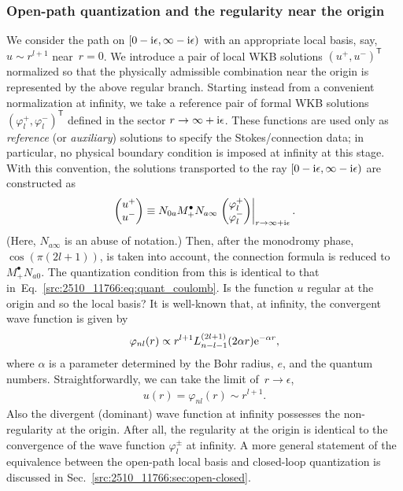 \subsubsection{Open-path quantization and the regularity near the origin}
We consider the path on $[0-\mathrm{i}\epsilon,\infty-\mathrm{i}\epsilon)$ with an appropriate local basis, say, $u\sim r^{l+1}$ near~$r=0$.
We introduce a pair of local WKB solutions $(u^{+},u^{-})^{\mathsf T}$ normalized so that the
physically admissible combination near the origin is represented by the above regular branch.
Starting instead from a convenient normalization at infinity, we take a reference pair of formal WKB solutions
$(\varphi_l^{+},\varphi_l^{-})^{\mathsf T}$ defined in the sector $r\to\infty+\mathrm{i}\epsilon$.
These functions are used only as \textit{reference} (or \textit{auxiliary}) solutions to specify the Stokes/connection
data; in particular, no physical boundary condition is imposed at infinity at this stage.
With this convention, the solutions transported to the ray $[0-\mathrm{i}\epsilon,\infty-\mathrm{i}\epsilon)$ are constructed as
\begin{align}
    \begin{pmatrix}
        u^{+} \\ u^{-}
    \end{pmatrix}
    \equiv
    N_{0a} M_{+}^\bullet N_{a\infty}
    \left.
    \begin{pmatrix}
        \varphi_l^{+} \\ \varphi_l^{-}
    \end{pmatrix}\right|_{r\to\infty+\mathrm{i} \epsilon} .
\end{align}
(Here, $N_{a\infty}$ is an abuse of notation.)
Then, after the monodromy phase, $\cos(\pi(2l+1))$, is taken into account, the connection formula is reduced to~$M_{+}^\bullet N_{a0}$. The quantization condition from this is identical to that in~Eq.~\eqref{src:2510_11766:eq:quant_coulomb}.
Is the function $u$ regular at the origin and so the local basis?
It is well-known that, at infinity, the convergent wave function is given by
\begin{align}
    \varphi_{nl}(r) \propto r^{l+1} L_{n-l-1}^{(2l+1)}(2\alpha r) \mathrm{e}^{-\alpha r} ,
\end{align}
where $\alpha$ is a parameter determined by the Bohr radius, $e$, and the quantum numbers.
Straightforwardly, we can take the limit of~$r\to\epsilon$,
\begin{align}
    u(r) = \varphi_{nl}(r) \sim r^{l+1} .
\end{align}
Also the divergent (dominant) wave function at infinity possesses the non-regularity at the origin.
After all, the regularity at the origin is identical to the convergence of the wave function $\varphi^\pm_l$ at infinity.
A more general statement of the equivalence between the open-path local basis and closed-loop quantization is discussed in Sec.~\ref{src:2510_11766:sec:open-closed}.
